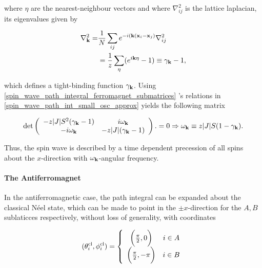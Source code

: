 where $\eta$ are the nearest-neighbour vectors and where $\nabla_{ij}^2$ is the lattice laplacian, its eigenvalues given by 

\begin{equation}
\begin{split}
    \nabla^2_{{\bf k}} =& \frac{1}{N} \sum_{ij} e^{- i({\bf k}({\bf x}_i - {\bf x}_j)} \nabla_{ij}^2 \\
    &= \frac{1}{z} \sum_{\eta} (e^{i {\bf k} \eta} - 1) \equiv \gamma_{{\bf k}} - 1,
\end{split}
\end{equation}

which defines a tight-binding function $\gamma_{{\bf k}}$. Using \cref{spin_wave_path_integral_ferromagnet_submatrices} 's relations in \cref{spin_wave_path_int_small_osc_approx} yields the following matrix 

\begin{equation}
   \det \left(\begin{array}{cc}
         -z |J| S^2 (\gamma_{{\bf k}} - 1) & i \omega_{{\bf k}}  \\
         -i \omega_{{\bf k}} & -z |J| (\gamma_{{\bf k}} - 1)
    \end{array}\right). = 0 \Rightarrow \omega_{{\bf k}} \equiv z |J| S (1- \gamma_{{\bf k}}). 
    \label{spin_wave_path_integral_spin_wave_modes}
\end{equation}

Thus, the spin wave is described by a time dependent precession of all spins about the $x$-direction with $\omega_{{\bf k}}$-angular frequency. \\

\paragraph{The Antiferromagnet}

In the antiferromagnetic case, the path integral can be expanded about the classical Néel state, which can be made to point in the $\pm x$-direction for the $A,B$ sublaticces respectively, without loss of generality, with coordinates 

\begin{equation}
    (\theta_i^{\textnormal{cl}}, \phi_i^{\textnormal{cl}}) = \left\{ \begin{array}{cc}
        \bigg(\frac{\pi}{2}, 0\bigg) & i \in A \\
        \bigg(\frac{\pi}{2}, -\pi\bigg) & i \in B
    \end{array} \right.
\end{equation}

